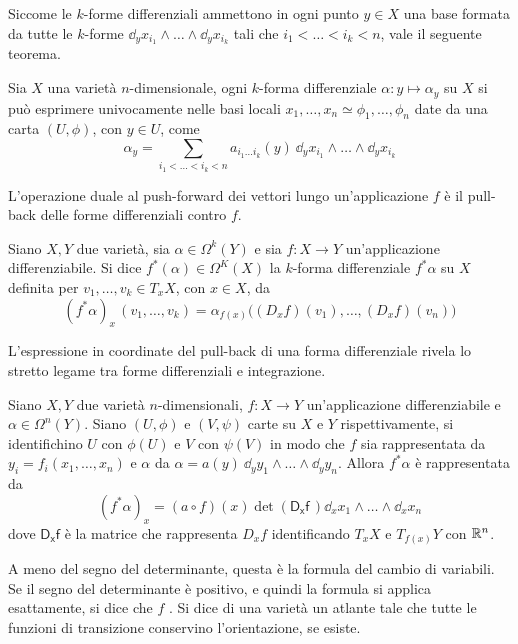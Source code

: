 Siccome le $k$-forme differenziali ammettono in ogni punto $y \in X$ una base formata da tutte le $k$-forme $\dd_y x_{i_1} \wedge \ldots \wedge \dd_y x_{i_k}$ tali che $i_1 < \ldots < i_k < n$, vale il seguente teorema.

\begin{theorem}
  Sia $X$ una varietà $n$-dimensionale, ogni $k$-forma differenziale $\alpha: y \mapsto \alpha_y$ su $X$ si può esprimere univocamente nelle basi locali $x_1, \ldots, x_n \simeq \phi_1, \ldots, \phi_n$ date da una carta $(U, \phi)$, con $y \in U$, come 
  \begin{equation*}
    \alpha_y = \sum_{i_1 < \ldots < i_k < n} a_{i_1\ldots i_k}(y)\ \dd_y x_{i_1} \wedge \ldots \wedge \dd_y x_{i_k}
  \end{equation*}
\end{theorem}

L'operazione duale al push-forward dei vettori lungo un'applicazione $f$ è il pull-back delle forme differenziali contro $f$.

\begin{definition}
  Siano $X,Y$ due varietà, sia $\alpha \in \Omega^k (Y)$ e sia $f:X\to Y$ un'applicazione differenziabile. Si dice  $f^*(\alpha) \in  \Omega^K(X)$ la $k$-forma differenziale $f^* \alpha$ su $X$ definita per $v_1, \ldots, v_k \in T_x X$, con $x \in X$, da \begin{equation*}
  (f^*\alpha)_x\, (v_1, \ldots, v_k) = \alpha_{f(x)}\big((D_x f)(v_1), \ldots, (D_x f)(v_n)\big)
  \end{equation*}  
\end{definition}

L'espressione in coordinate del pull-back di una forma differenziale rivela lo stretto legame tra forme differenziali e integrazione.
\begin{theorem} \label{thm:varChange}
  Siano $X,Y$ due varietà $n$-dimensionali, $f:X\to Y$ un'applicazione differenziabile e $\alpha \in  \Omega^n(Y)$. Siano $(U, \phi)$ e $(V,\psi)$ carte su $X$ e $Y$ rispettivamente, si identifichino $U$ con $\phi(U)$ e $V$ con $\psi(V)$ in modo che $f$ sia rappresentata da $y_i = f_i(x_1, \ldots, x_n)$ e $\alpha$ da $\alpha = a(y)\ \dd_y y_1\wedge \ldots \wedge \dd_y y_n$. Allora $f^* \alpha$ è rappresentata da \begin{equation*}
  (f^* \alpha)_x = (a \circ f)(x) \det(\mathsf{D_x f}\,)\dd_x x_1 \wedge \ldots \wedge \dd_x x_n
  \end{equation*}
  dove $\mathsf{D_x f}$ è la matrice che rappresenta $D_x f$ identificando $T_x X$ e $T_{f(x)}Y$ con $\mathbb{R}^{n}$.
\end{theorem}
\begin{remark}
  A meno del segno del determinante, questa è la formula del cambio di variabili. Se il segno del determinante è positivo, e quindi la formula si applica esattamente, si dice che $f$ . Si dice  di una varietà un atlante tale che tutte le funzioni di transizione conservino l'orientazione, se esiste.
\end{remark}

